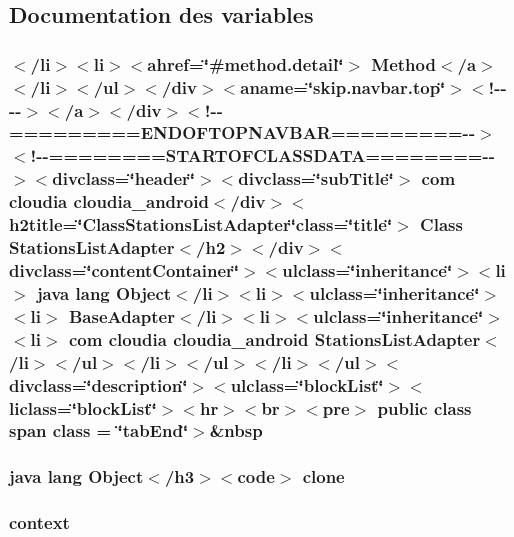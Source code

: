 \subsection{Documentation des variables}
\hypertarget{_stations_list_adapter_8html_a9f136948a2185f8dca28a4de85c0aa2c}{
\subsubsection[{class}]{\setlength{\rightskip}{0pt plus 5cm}$<$/li$>$$<$li$>$$<$ahref=\char`\"{}\#method.\-detail\char`\"{}$>$ Method$<$/{\bf a}$>$$<$/li$>$$<$/ul$>$$<$/div$>$$<$aname=\char`\"{}skip.\-navbar.\-top\char`\"{}$>$$<$!-\/-\/-\/-\/$>$$<$/a$>$$<$/div$>$$<$!-\/-\/=========E\-N\-D\-O\-F\-T\-O\-P\-N\-A\-V\-B\-A\-R=========-\/-\/$>$$<$!-\/-\/========S\-T\-A\-R\-T\-O\-F\-C\-L\-A\-S\-S\-D\-A\-T\-A========-\/-\/$>$$<$divclass=\char`\"{}header\char`\"{}$>$$<$divclass=\char`\"{}sub\-Title\char`\"{}$>$ com cloudia cloudia\-\_\-android$<$/div$>$$<$h2title=\char`\"{}Class\-Stations\-List\-Adapter\char`\"{}class=\char`\"{}title\char`\"{}$>$ Class {\bf Stations\-List\-Adapter}$<$/h2$>$$<$/div$>$$<$divclass=\char`\"{}content\-Container\char`\"{}$>$$<$ulclass=\char`\"{}inheritance\char`\"{}$>$$<$li$>$ java lang Object$<$/li$>$$<$li$>$$<$ulclass=\char`\"{}inheritance\char`\"{}$>$$<$li$>$ Base\-Adapter$<$/li$>$$<$li$>$$<$ulclass=\char`\"{}inheritance\char`\"{}$>$$<$li$>$ com cloudia cloudia\-\_\-android {\bf Stations\-List\-Adapter}$<$/li$>$$<$/ul$>$$<$/li$>$$<$/ul$>$$<$/li$>$$<$/ul$>$$<$divclass=\char`\"{}description\char`\"{}$>$$<$ulclass=\char`\"{}block\-List\char`\"{}$>$$<$liclass=\char`\"{}block\-List\char`\"{}$>$$<$hr$>$$<$br$>$$<$pre$>$ public class {\bf span} class = \char`\"{}tab\-End\char`\"{}$>$\&nbsp}}\label{_stations_list_adapter_8html_a9f136948a2185f8dca28a4de85c0aa2c}
\hypertarget{_stations_list_adapter_8html_adc9607fcabf6f2d7f401ad52015ef6e0}{
\subsubsection[{clone}]{\setlength{\rightskip}{0pt plus 5cm}java lang Object$<$/h3$>$$<$code$>$ clone}}\label{_stations_list_adapter_8html_adc9607fcabf6f2d7f401ad52015ef6e0}
\hypertarget{_stations_list_adapter_8html_a261f9f58ccbeaa962c4e675e4212c9cc}{
\subsubsection[{context}]{\setlength{\rightskip}{0pt plus 5cm}context}}\label{_stations_list_adapter_8html_a261f9f58ccbeaa962c4e675e4212c9cc}
